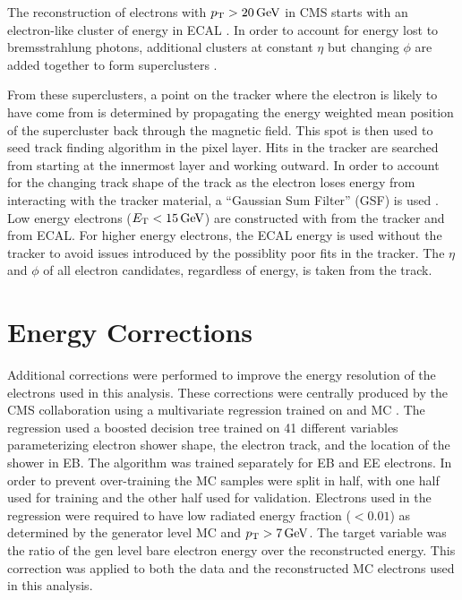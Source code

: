 The reconstruction of electrons with $p_{\mathrm{T}} > 20 \,\text{Ge\hspace{-.08em}V}$ in CMS starts with an
electron-like cluster of energy in ECAL \cite{eg_reco_2010}. In order to
account for energy lost to bremsstrahlung photons, additional clusters at
constant $\eta$ but changing $\phi$ are added together to form superclusters
\cite{baffioni_2007}. 

From these superclusters, a point on the tracker where the electron is likely
to have come from is determined by propagating the energy weighted mean
position of the supercluster back through the magnetic field. This spot is then
used to seed  track finding algorithm in the pixel layer. Hits in the tracker
are searched from starting at the innermost layer and working outward. In order
to account for the changing track shape of the track as the electron loses
energy from interacting with the tracker material, a ``Gaussian Sum Filter''
(GSF) is used \cite{adam_2005}. Low energy electrons ($E_{\mathrm{T}} < 15 \,\text{Ge\hspace{-.08em}V}$) are
constructed with \pt from the tracker and \ET from ECAL. For higher energy
electrons, the ECAL energy is used without the tracker \pt to avoid issues
introduced by the possiblity poor fits in the tracker. The $\eta$ and $\phi$ of
all electron candidates, regardless of energy, is taken from the track.

\section{Energy Corrections}

Additional corrections were performed to improve the energy resolution of the
electrons used in this analysis. These corrections were centrally produced by
the CMS collaboration using a multivariate regression trained on \Ztoee and
\higgstoZZ MC \cite{cms_an_2012-327}. The regression used a boosted decision
tree trained on 41 different variables parameterizing electron shower shape,
the electron track, and the location of the shower in EB. The algorithm was
trained separately for EB and EE electrons. In order to prevent over-training
the MC samples were split in half, with one half used for training and the
other half used for validation. Electrons used in the regression were required
to have low radiated energy fraction ($< 0.01$) as determined by the generator
level MC and $p_{\mathrm{T}} > 7 \,\text{Ge\hspace{-.08em}V}$. The target variable was the ratio of the gen level
bare electron energy over the reconstructed energy. This correction was applied
to both the data and the reconstructed MC electrons used in this analysis.

